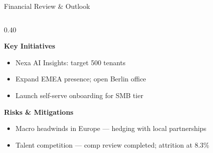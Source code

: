 \documentclass[11pt,aspectratio=169]{beamer}
\begin{document}
\begin{frame}{Financial Review \& Outlook}
\begin{columns}[T]
\begin{column}{0.40\textwidth}
      \vspace{0.3cm}

      \begin{tcolorbox}[outlookbox]
        \small
        \textbf{\color{nxnavy}Key Initiatives}\\[0.15cm]
        \begin{itemize}
          \setlength\itemsep{0.2em}
          \item Nexa AI Insights: target 500 tenants
          \item Expand EMEA presence; open Berlin office
          \item Launch self-serve onboarding for SMB tier
        \end{itemize}
      \end{tcolorbox}

      \vspace{0.25cm}

      \begin{tcolorbox}[outlookbox]
        \small
        \textbf{\color{nxnavy}Risks \& Mitigations}\\[0.15cm]
        \begin{itemize}
          \setlength\itemsep{0.2em}
          \item Macro headwinds in Europe — hedging with local partnerships
          \item Talent competition — comp review completed; attrition at 8.3\%
        \end{itemize}
      \end{tcolorbox}
    \end{column}
  \end{columns}

\end{frame}
\end{document}
